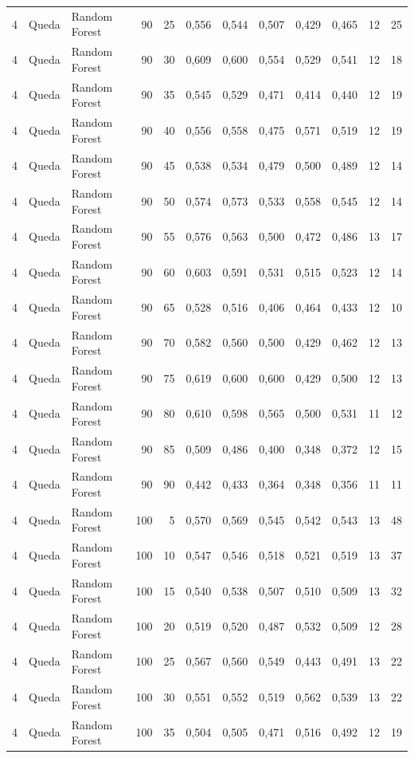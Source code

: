 \begin{longtable}{@{}rllrrrrrrrrr@{}}
4 & Queda & Random Forest & 90 & 25 & 0,556 & 0,544 & 0,507 & 0,429 & 0,465 & 12 & 25 \\
4 & Queda & Random Forest & 90 & 30 & 0,609 & 0,600 & 0,554 & 0,529 & 0,541 & 12 & 18 \\
4 & Queda & Random Forest & 90 & 35 & 0,545 & 0,529 & 0,471 & 0,414 & 0,440 & 12 & 19 \\
4 & Queda & Random Forest & 90 & 40 & 0,556 & 0,558 & 0,475 & 0,571 & 0,519 & 12 & 19 \\
4 & Queda & Random Forest & 90 & 45 & 0,538 & 0,534 & 0,479 & 0,500 & 0,489 & 12 & 14 \\
4 & Queda & Random Forest & 90 & 50 & 0,574 & 0,573 & 0,533 & 0,558 & 0,545 & 12 & 14 \\
4 & Queda & Random Forest & 90 & 55 & 0,576 & 0,563 & 0,500 & 0,472 & 0,486 & 13 & 17 \\
4 & Queda & Random Forest & 90 & 60 & 0,603 & 0,591 & 0,531 & 0,515 & 0,523 & 12 & 14 \\
4 & Queda & Random Forest & 90 & 65 & 0,528 & 0,516 & 0,406 & 0,464 & 0,433 & 12 & 10 \\
4 & Queda & Random Forest & 90 & 70 & 0,582 & 0,560 & 0,500 & 0,429 & 0,462 & 12 & 13 \\
4 & Queda & Random Forest & 90 & 75 & 0,619 & 0,600 & 0,600 & 0,429 & 0,500 & 12 & 13 \\
4 & Queda & Random Forest & 90 & 80 & 0,610 & 0,598 & 0,565 & 0,500 & 0,531 & 11 & 12 \\
4 & Queda & Random Forest & 90 & 85 & 0,509 & 0,486 & 0,400 & 0,348 & 0,372 & 12 & 15 \\
4 & Queda & Random Forest & 90 & 90 & 0,442 & 0,433 & 0,364 & 0,348 & 0,356 & 11 & 11 \\
4 & Queda & Random Forest & 100 & 5 & 0,570 & 0,569 & 0,545 & 0,542 & 0,543 & 13 & 48 \\
4 & Queda & Random Forest & 100 & 10 & 0,547 & 0,546 & 0,518 & 0,521 & 0,519 & 13 & 37 \\
4 & Queda & Random Forest & 100 & 15 & 0,540 & 0,538 & 0,507 & 0,510 & 0,509 & 13 & 32 \\
4 & Queda & Random Forest & 100 & 20 & 0,519 & 0,520 & 0,487 & 0,532 & 0,509 & 12 & 28 \\
4 & Queda & Random Forest & 100 & 25 & 0,567 & 0,560 & 0,549 & 0,443 & 0,491 & 13 & 22 \\
4 & Queda & Random Forest & 100 & 30 & 0,551 & 0,552 & 0,519 & 0,562 & 0,539 & 13 & 22 \\
4 & Queda & Random Forest & 100 & 35 & 0,504 & 0,505 & 0,471 & 0,516 & 0,492 & 12 & 19 \\

\end{longtable}
